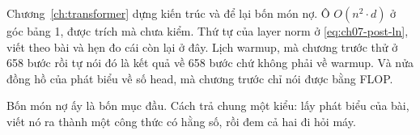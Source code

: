 Chương~\ref{ch:transformer} dựng kiến trúc và để lại bốn món nợ. Ô \(O(n^2 \cdot d)\)
ở góc bảng 1, được trích mà chưa kiểm. Thứ tự của layer norm ở
\eqref{eq:ch07-post-ln}, viết theo bài và hẹn đo cái còn lại ở đây. Lịch warmup,
mà chương trước thử ở 658 bước rồi tự nói đó là kết quả về 658 bước chứ không
phải về warmup. Và nửa đồng hồ của phát biểu về số head, mà chương trước chỉ nói
được bằng FLOP.

Bốn món nợ ấy là bốn mục đầu. Cách trả chung một kiểu: lấy phát biểu của bài,
viết nó ra thành một công thức có hằng số, rồi đem cả hai đi hỏi máy.











